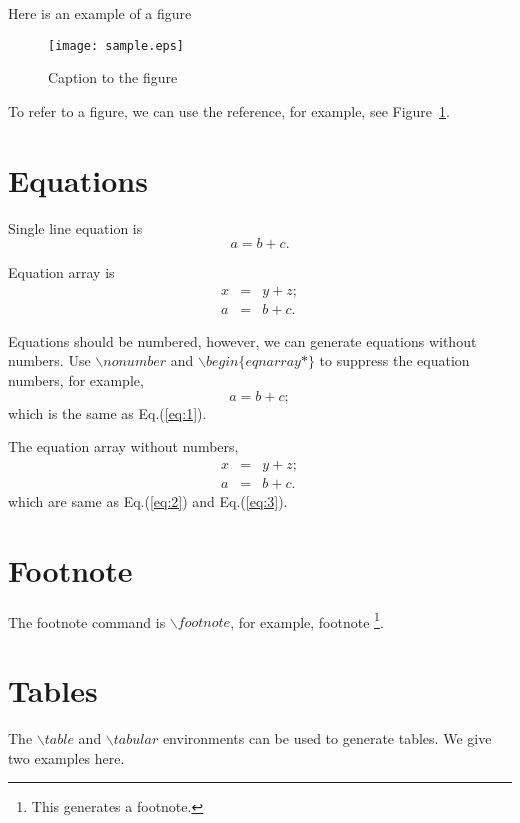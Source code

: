 \documentclass[12pt]{article}
\renewcommand{\baselinestretch}{2}
\begin{document}
Here is an example of a figure
\begin{figure}[h]
\hfill
\begin{center}
\texttt{[image: sample.eps]}
\end{center}
\caption{Caption to the figure}
\label{Fig:sample}
\end{figure}

To refer to a figure, we can use the reference, for example, see Figure~\ref{Fig:sample}.


%

\section{Equations}
Single line equation is
\begin{equation}
a = b+c. \label{eq:1}
\end{equation}

Equation array is
\begin{eqnarray}
x &=& y+z; \label{eq:2} \\
a &=& b+c.  \label{eq:3}
\end{eqnarray}

Equations should be numbered, however, we can generate equations without numbers. Use $\backslash nonumber$ and $\backslash begin\{eqnarray\ast\}$ to suppress the equation numbers, for example,
\begin{equation}
\nonumber a = b + c;
\end{equation}
which is the same as Eq.(\ref{eq:1}).

The equation array without numbers,
\begin{eqnarray*}
x &=& y+z;\\
a &=& b+c.
\end{eqnarray*}
which are same as Eq.(\ref{eq:2}) and Eq.(\ref{eq:3}).

\section{Footnote}
The footnote command is $\backslash footnote$, for example, footnote \footnote{\normalsize This generates a footnote.}. 

\section{Tables}
The $\backslash table$ and $\backslash tabular$ environments can be used to generate tables. We give two examples here.
\end{document}
